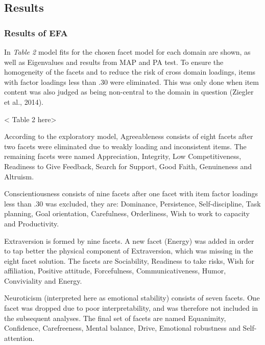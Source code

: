 \documentclass[,man,floatsintext]{apa6}
\theoremstyle{definition}
\theoremstyle{definition}
\theoremstyle{definition}
\theoremstyle{remark}
\begin{document}
\hypertarget{results}{%
\subsection{Results}\label{results}}

\hypertarget{results-of-efa}{%
\subsubsection{Results of EFA}\label{results-of-efa}}

In \emph{Table 2} model fits for the chosen facet model for each domain
are shown, as well as Eigenvalues and results from MAP and PA test. To
ensure the homogeneity of the facets and to reduce the risk of cross
domain loadings, items with factor loadings less than .30 were
eliminated. This was only done when item content was also judged as
being non-central to the domain in question (Ziegler et al., 2014).

\vspace{5mm}

\textless{} Table 2 here\textgreater{}

\vspace{5mm}

According to the exploratory model, Agreeableness consists of eight
facets after two facets were eliminated due to weakly loading and
inconsistent items. The remaining facets were named Appreciation,
Integrity, Low Competitiveness, Readiness to Give Feedback, Search for
Support, Good Faith, Genuineness and Altruism.

Conscientiousness consists of nine facets after one facet with item
factor loadings less than .30 was excluded, they are: Dominance,
Persistence, Self-discipline, Task planning, Goal orientation,
Carefulness, Orderliness, Wish to work to capacity and Productivity.

Extraversion is formed by nine facets. A new facet (Energy) was added in
order to tap better the physical component of Extraversion, which was
missing in the eight facet solution. The facets are Sociability,
Readiness to take risks, Wish for affiliation, Positive attitude,
Forcefulness, Communicativeness, Humor, Conviviality and Energy.

Neuroticism (interpreted here as emotional stability) consists of seven
facets. One facet was dropped due to poor interpretability, and was
therefore not included in the subsequent analyses. The final set of
facets are named Equanimity, Confidence, Carefreeness, Mental balance,
Drive, Emotional robustness and Self-attention.
\end{document}
